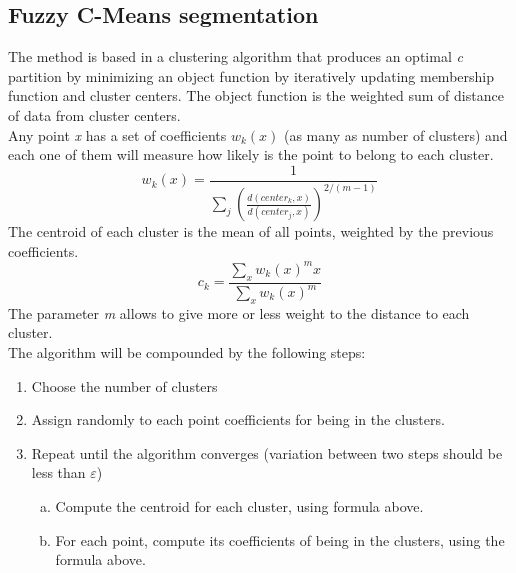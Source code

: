 \documentclass[a4paper, 10pt, conference]{ieeeconf}        %
\begin{document}
\subsection{Fuzzy C-Means segmentation}
The method is based in a clustering algorithm that produces an optimal \textit{c} partition by minimizing an object function by iteratively updating membership function and cluster centers. The object function is the weighted sum of distance of data from cluster centers.\\
Any point \textit{x} has a set of coefficients \textit{$ w_{k}(x)$} (as many as number of clusters) and each one of them will measure how likely is the point to belong to each cluster. \\
\begin{equation}
w_{k}(x)=\frac{1}{\sum\limits_{j}(\frac{d(center_{k},x)}{d(center_{j},x)})^{2/(m-1)}}
\end{equation}
The centroid of each cluster is the mean of all points, weighted by the previous coefficients.
\begin{equation}
c_{k}=\dfrac{\sum\limits_{x}w_{k}(x)^mx}{\sum\limits_{x}w_{k}(x)^m}
\end{equation}
The parameter \textit{m} allows to give more or less weight to the distance to each cluster.\\
The algorithm will be compounded by the following steps:
\begin{enumerate}

\item Choose the number of clusters
\item Assign randomly to each point coefficients for being in the clusters.
\item Repeat until the algorithm converges (variation between two steps should be less than  $\varepsilon$)
	\begin{enumerate}[(a)]
		\item Compute the centroid for each cluster, using formula above.
		\item For each point, compute its coefficients of being in the clusters, using the formula above.
	\end{enumerate}
\end{enumerate}
\end{document}
